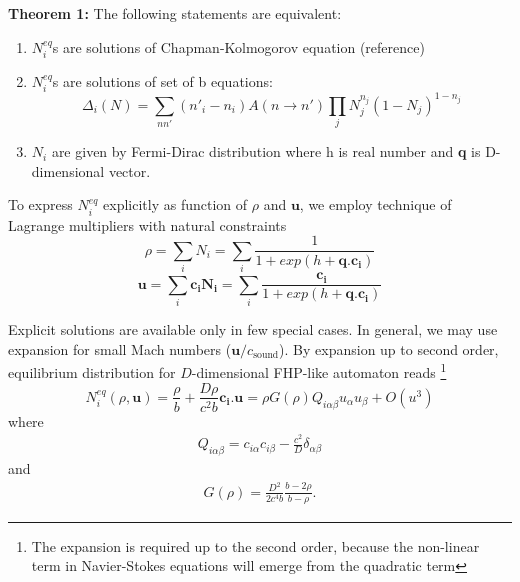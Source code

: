 \textbf{Theorem 1:}
The following statements are equivalent:
\begin{enumerate}
\item $N_i^{eq}$s are solutions of Chapman-Kolmogorov equation (reference)\\
\item $N_i^{eq}$s are solutions of set of b equations:
\begin{equation}
\Delta_i(N) = \sum_{nn'}(n'_i - n_i)A(n \rightarrow n')\prod_j N_j^{n_j}(1-N_j)^{1-n_j}
\end{equation} 

\item $N_i$ are given by Fermi-Dirac distribution
where h is real number and \textbf{q} is D-dimensional vector.
\end{enumerate}

\bigskip

To express $N_i^{eq}$ explicitly as function of $\rho$ and $\bm{u}$, we employ technique of Lagrange multipliers with natural constraints
\begin{equation}
\rho = \sum_i N_i = \sum_i \frac{1}{1+ exp(h + \bm{q}.\bm{c_i})}
\end{equation}
\begin{equation}
\bm{u} = \sum_i \bm{c_i} \bm{N_i} = \sum_i \frac{\bm{c_i}}{1+ exp(h + \bm{q}.\bm{c_i})}
\end{equation}

Explicit solutions are available only in few special cases.
In general, we may use expansion for small Mach numbers ($\bm{u}/c_{\mathrm{sound}}$). By expansion up to second order, equilibrium distribution for $D$-dimensional FHP-like automaton reads \footnote{The expansion is required up to the second order, because the non-linear term in Navier-Stokes equations will emerge from the quadratic term}
\begin{equation} \label{eou}
N_i^{eq}(\rho,\bm{u}) = \frac{\rho}{b} + \frac{D\rho}{c^2 b}\bm{c_i}.\bm{u} = \rho G(\rho) Q_{i\alpha\beta}u_{\alpha}u_{\beta} + O(u^3)
\end{equation}
where 
\begin{align}
Q_{i\alpha\beta} = c_{i\alpha} c_{i\beta} - \frac{c^2}{D} \delta_{\alpha\beta}
\end{align}
and
\begin{align}
G(\rho) = \frac{D^2}{2c^4b}\frac{b-2\rho}{b-\rho}.
\end{align}

